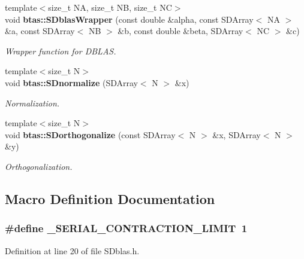 \begin{DoxyCompactItemize}
{\footnotesize template$<$size\-\_\-t N\-A, size\-\_\-t N\-B, size\-\_\-t N\-C$>$ }\\void {\bf btas\-::\-S\-Dblas\-Wrapper} (const double \&alpha, const S\-D\-Array$<$ N\-A $>$ \&a, const S\-D\-Array$<$ N\-B $>$ \&b, const double \&beta, S\-D\-Array$<$ N\-C $>$ \&c)
\begin{DoxyCompactList}\small\item\em Wrapper function for D\-B\-L\-A\-S. \end{DoxyCompactList}\item 
{\footnotesize template$<$size\-\_\-t N$>$ }\\void {\bf btas\-::\-S\-Dnormalize} (S\-D\-Array$<$ N $>$ \&x)
\begin{DoxyCompactList}\small\item\em Normalization. \end{DoxyCompactList}\item 
{\footnotesize template$<$size\-\_\-t N$>$ }\\void {\bf btas\-::\-S\-Dorthogonalize} (const S\-D\-Array$<$ N $>$ \&x, S\-D\-Array$<$ N $>$ \&y)
\begin{DoxyCompactList}\small\item\em Orthogonalization. \end{DoxyCompactList}\end{DoxyCompactItemize}


\subsection{Macro Definition Documentation}
\subsubsection[{\-\_\-\-S\-E\-R\-I\-A\-L\-\_\-\-C\-O\-N\-T\-R\-A\-C\-T\-I\-O\-N\-\_\-\-L\-I\-M\-I\-T}]{\setlength{\rightskip}{0pt plus 5cm}\#define \-\_\-\-S\-E\-R\-I\-A\-L\-\_\-\-C\-O\-N\-T\-R\-A\-C\-T\-I\-O\-N\-\_\-\-L\-I\-M\-I\-T~1}\label{d6/de7/SDblas_8h_a857974474ee05fe3dc0f227810db7d9e}


Definition at line 20 of file S\-Dblas.\-h.

